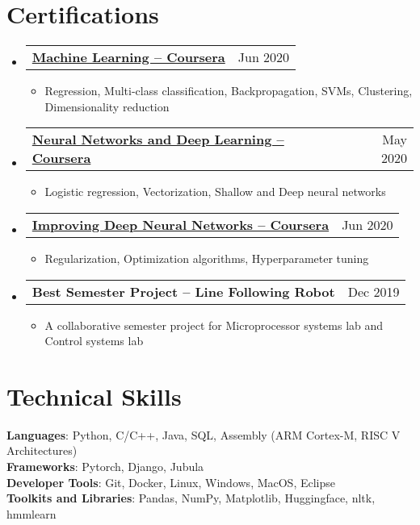 \documentclass[letterpaper,11pt]{article}
\makeatletter
\newcommand{\resumeItem}[1]{
  \item\small{
    {#1 \vspace{-2pt}}
  }
}
\newcommand{\resumeProjectHeading}[2]{
  \item
  \begin{tabular*}{0.97\textwidth}{l@{\extracolsep{\fill}}r}
    \small#1 & #2 \\
  \end{tabular*}\vspace{-7pt}
}
\newcommand{\resumeSubHeadingListStart}{\begin{itemize}[leftmargin=0.15in, label={}]}
\newcommand{\resumeSubHeadingListEnd}{\end{itemize}}
\newcommand{\resumeItemListStart}{\begin{itemize}}
\newcommand{\resumeItemListEnd}{\end{itemize}\vspace{-5pt}}
\makeatother
\begin{document}
\section{Certifications}
  \resumeSubHeadingListStart
    \resumeProjectHeading
      {\href{https://www.coursera.org/account/accomplishments/certificate/UV8TRJ6E6YYU}{\textbf{Machine Learning -- Coursera}}}{Jun 2020}
      \resumeItemListStart
        \resumeItem{Regression, Multi-class classification, Backpropagation, SVMs, Clustering, Dimensionality reduction}
      \resumeItemListEnd
    \resumeProjectHeading
      {\href{https://www.coursera.org/account/accomplishments/certificate/B2RWCJF7G97J}{\textbf{Neural Networks and Deep Learning -- Coursera}}}{May 2020}
      \resumeItemListStart
        \resumeItem{Logistic regression, Vectorization, Shallow and Deep neural networks}
      \resumeItemListEnd
    \resumeProjectHeading
      {\href{https://www.coursera.org/account/accomplishments/certificate/KREV2D4MXD7V}{\textbf{Improving Deep Neural Networks -- Coursera}}}{Jun 2020}
      \resumeItemListStart
        \resumeItem{Regularization, Optimization algorithms, Hyperparameter tuning}
      \resumeItemListEnd
    \resumeProjectHeading
      {\textbf{Best Semester Project – Line Following Robot}}{Dec 2019}
      \resumeItemListStart
        \resumeItem{A collaborative semester project for Microprocessor systems lab and Control systems lab}
      \resumeItemListEnd
  \resumeSubHeadingListEnd
            
%
\section{Technical Skills}
 \begin{itemize}[leftmargin=0.15in, label={}]
    \small{\item{
     \textbf{Languages}{: Python, C/C++, Java, SQL, Assembly (ARM Cortex-M, RISC V Architectures)} \\
     \textbf{Frameworks}{: Pytorch, Django, Jubula} \\
     \textbf{Developer Tools}{: Git, Docker, Linux, Windows, MacOS, Eclipse} \\
     \textbf{Toolkits and Libraries}{: Pandas, NumPy, Matplotlib, Huggingface, nltk, hmmlearn}
    }}
 \end{itemize}

\end{document}
